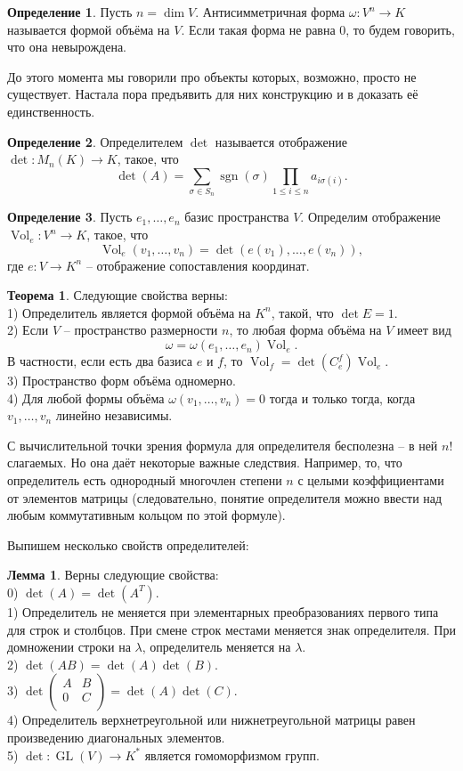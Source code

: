 \documentclass[10pt,a4paper,oneside]{book} %
\theoremstyle{definition}
\newtheorem*{defn}{Определение}
\newtheorem{thm}{Теорема}
\newtheorem{lem}{Лемма}
\newcommand{\Vol}{\operatorname{Vol}}
\newcommand{\GL}{\operatorname{GL}}
\newcommand{\sgn}{\operatorname{sgn}}
\def\dfn{\begin{defn}}
\def\edfn{\end{defn}}
\def\lm{\begin{lem}}
\def\elm{\end{lem}}
\begin{document}
\begin{defn}
Пусть $n=\dim V$. Антисимметричная форма $\omega \colon V^n \to K $ называется формой объёма на $V$. Если такая форма не равна 0, то будем говорить, что она невырождена. 
\end{defn}



До этого момента мы говорили про объекты которых, возможно, просто не существует. Настала пора предъявить для них конструкцию и в  доказать её единственность.

\dfn  Определителем $\det$ называется отображение $\det \colon M_n(K) \to K$, такое, что $$\det(A)=\sum_{\sigma \in S_n} \sgn(\sigma)\prod_{1\leq i\leq n} a_{i\sigma(i)}.$$
\edfn

\dfn Пусть $e_1,\dots,e_n$ базис пространства $V$. Определим отображение $\Vol_e \colon V^n \to K$, такое, что 
$$\Vol_e(v_1,\dots,v_n)=\det(e(v_1),\dots, e(v_n)),$$ 
где $e\colon V \to K^n$ -- отображение сопоставления координат.
\edfn

\begin{thm} Следующие свойства верны:\\
1) Определитель является формой объёма на $K^n$, такой, что $\det E=1$.\\
2) Если $V$ -- пространство размерности $n$, то любая форма объёма на $V$ имеет вид $$\omega=\omega(e_1,\dots,e_n)\Vol_e.$$
В частности, если есть два базиса $e$ и $f$, то $\Vol_{f}=\det(C^f_{e}) \Vol_{e}$.\\
3) Пространство форм объёма одномерно.\\
4) Для любой формы объёма $\omega(v_1,\dots,v_n)=0$ тогда и только тогда, когда $v_1,\dots,v_n$ линейно независимы.
\proof
\endproof
\end{thm}



С вычислительной точки зрения формула для определителя бесполезна -- в ней $n!$ слагаемых. Но она даёт некоторые важные следствия. Например, то, что определитель есть однородный многочлен степени $n$ с целыми коэффициентами от элементов матрицы (следовательно, понятие определителя можно ввести над любым коммутативным кольцом по этой формуле).

Выпишем несколько свойств определителей:

\lm Верны следующие свойства:\\
0) $\det(A)=\det(A^{T})$.\\
1) Определитель не меняется при элементарных преобразованиях первого типа для строк и столбцов. При смене строк местами меняется знак определителя. При домножении строки на $\lambda$, определитель меняется на $\lambda$.\\
2) $\det(AB)=\det(A)\det(B)$.\\
3) $\det \left(\begin{matrix}A & B\\
0 & C \\
\end{matrix}\right)= \det(A)\det(C)$.\\
4) Определитель верхнетреугольной или нижнетреугольной матрицы равен произведению диагональных элементов.\\
5) $\det \colon \GL(V) \to K^*$
является гомоморфизмом групп.
\elm
\end{document}
